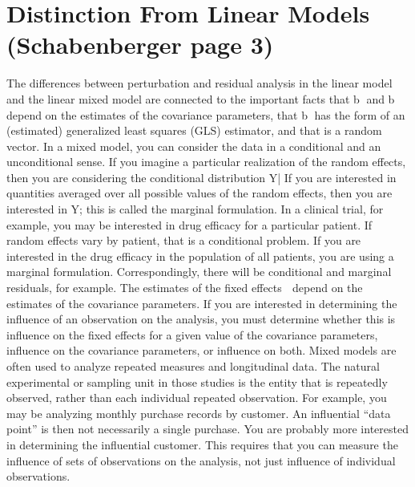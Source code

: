 \documentclass[12pt, a4paper]{report}
\theoremstyle{plain}
\theoremstyle{definition}
\theoremstyle{remark}
\begin{document}
	\section{Distinction From Linear Models (Schabenberger page 3)}
 The differences between perturbation and residual analysis in the linear model and the linear mixed model
		are connected to the important facts that b and b
		depend on the estimates of the covariance parameters,
		that b has the form of an (estimated) generalized least squares (GLS) estimator, and that 
		is a random
		vector.
 In a mixed model, you can consider the data in a conditional and an unconditional sense. If you imagine
		a particular realization of the random effects, then you are considering the conditional distribution
		Y|
 If you are interested in quantities averaged over all possible values of the random effects, then
		you are interested in Y; this is called the marginal formulation. In a clinical trial, for example, you
		may be interested in drug efficacy for a particular patient. If random effects vary by patient, that is a
		conditional problem. If you are interested in the drug efficacy in the population of all patients, you are
		using a marginal formulation. Correspondingly, there will be conditional and marginal residuals, for
		example.
The estimates of the fixed effects  depend on the estimates of the covariance parameters. If you are
		interested in determining the influence of an observation on the analysis, you must determine whether
		this is influence on the fixed effects for a given value of the covariance parameters, influence on the
		covariance parameters, or influence on both.
Mixed models are often used to analyze repeated measures and longitudinal data. The natural experimental
		or sampling unit in those studies is the entity that is repeatedly observed, rather than each
		individual repeated observation. For example, you may be analyzing monthly purchase records by
		customer. 
An influential “data point” is then not necessarily a single purchase. You are probably more
		interested in determining the influential customer. This requires that you can measure the influence
		of sets of observations on the analysis, not just influence of individual observations.
\end{document}
